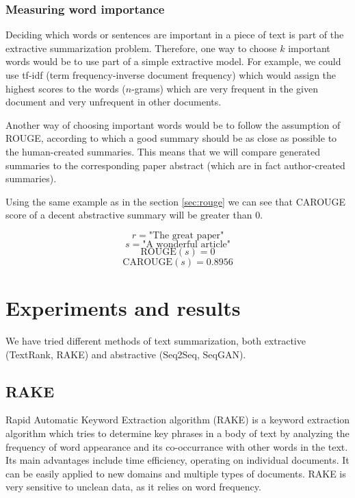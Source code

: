 \documentclass[sigplan]{acmart}
\begin{document}
\subsubsection{Measuring word importance}
\label{sec:importance}

Deciding which words or sentences are important in a piece of text is part of the extractive summarization problem. Therefore, one way to choose $k$ important words would be to use part of a simple extractive model. For example, we could use tf-idf (term frequency-inverse document frequency) which would assign the highest scores to the words ($n$-grams) which are very frequent in the given document and very unfrequent in other documents.

Another way of choosing important words would be to follow the assumption of ROUGE, according to which a good summary should be as close as possible to the human-created summaries. This means that we will compare generated summaries to the corresponding paper abstract (which are in fact author-created summaries).

Using the same example as in the section \ref{sec:rouge} we can see that CAROUGE score of a decent abstractive summary will be greater than 0.

\[ r = \text{"The great paper"} \]
\[ s = \text{"A wonderful article"} \]
\[ \text{ROUGE}(s) = 0 \]
\[ \text{CAROUGE}(s) = 0.8956 \]

\section{Experiments and results}

We have tried different methods of text summarization, both extractive (TextRank, RAKE) and abstractive (Seq2Seq, SeqGAN).

\subsection{RAKE}

Rapid Automatic Keyword Extraction algorithm (RAKE)\cite{rose-10} is a keyword extraction algorithm which tries to determine key phrases in a body of text by analyzing the frequency of word appearance and its co-occurrance with other words in the text. Its main advantages include time efficiency, operating on individual documents. It can be easily applied to new domains and multiple types of documents. RAKE is very sensitive to unclean data, as it relies on word frequency.
\end{document}
